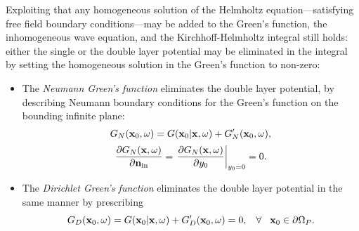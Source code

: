 Exploiting that any homogeneous solution of the Helmholtz equation---satisfying free field boundary conditions---may be added to the Green's function, the inhomogeneous wave equation, and the Kirchhoff-Helmholtz integral still holds: either the single or the double layer potential may be eliminated in the integral by setting the homogeneous solution in the Green's function to non-zero:
\begin{itemize}
\item The \emph{Neumann Green's function} eliminates the double layer potential, by describing Neumann boundary conditions for the Green's function on the bounding infinite plane:
\begin{equation}
G_N(\mathbf{x}_0,\omega) = G(\mathbf{x}_0|\mathbf{x},\omega) + G'_N(\mathbf{x}_0,\omega),
\end{equation}
\begin{equation}
\frac{\partial G_N(\mathbf{x},\omega) }{\partial \mathbf{n}_{\mathrm{in}}} = \left. \frac{\partial G_N(\mathbf{x},\omega) }{\partial y_0} \right|_{y_0 = 0} = 0.
\label{Eq:Theory:Neumann_Greenfun_def}
\end{equation}
\item The \emph{Dirichlet Green's function} eliminates the double layer potential in the same manner by prescribing
\begin{equation}
G_D(\mathbf{x}_0,\omega) = G(\mathbf{x}_0|\mathbf{x},\omega) + G'_D(\mathbf{x}_0,\omega) = 0, \hspace{3mm} \forall \hspace{3mm} \mathbf{x}_0 \in \partial \Omega_P.
\label{Eq:Theory:Dirichlet_Greenfun_def}
\end{equation}
\end{itemize}

